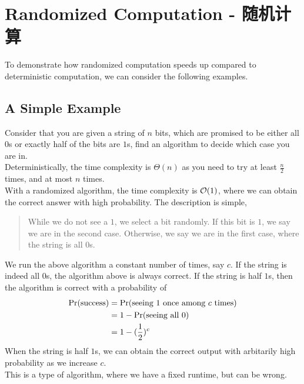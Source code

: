 \section{Randomized Computation - 随机计算}
To demonstrate how randomized computation speeds up compared to deterministic computation, we can consider the following examples.

\subsection{A Simple Example}
Consider that you are given a string of $n$ bits, which are promised to be either all $0$s or exactly half of the bits are $1$s, find an algorithm to decide which case you are in. \\
Deterministically, the time complexity is $\Theta(n)$ as you need to try at least $\frac{n}{2}$ times, and at most $n$ times. \\
With a randomized algorithm, the time complexity is $\order{1}$, where we can obtain the correct answer with high probability. The description is simple,
\begin{quote}
    While we do not see a $1$, we select a bit randomly. If this bit is $1$, we say we are in the second case. Otherwise, we say we are in the first case, where the string is all $0$s.
\end{quote}
We run the above algorithm a constant number of times, say $c$. If the string is indeed all $0$s, the algorithm above is always correct. If the string is half $1$s, then the algorithm is correct with a probability of
\begin{align*}
    \text{Pr}(\text{success}) &= \text{Pr}(\text{seeing }1\text{ once among }c\text{ times}) \\
    &= 1 - \text{Pr}(\text{seeing all }0) \\
    &= 1 - (\frac{1}{2})^c
\end{align*}
When the string is half $1$s, we can obtain the correct output with arbitarily high probability as we increase $c$. \\
This is a type of  algorithm, where we have a fixed runtime, but can be wrong.

